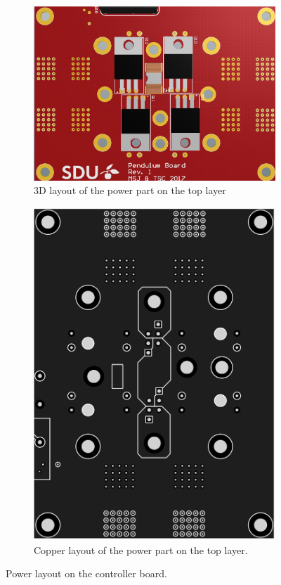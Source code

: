 \begin{figure}
	\centering
	\begin{subfigure}[b]{0.49\textwidth}
		\centering
		\includegraphics[angle=90,width=\linewidth]{graphics/power_layout_3}
		\caption{3D layout of the power part on the top layer}
		\label{sfig:power_layout_3}
	\end{subfigure}
	\begin{subfigure}[b]{0.49\textwidth} 
		\centering
		\includegraphics[width=\linewidth]{graphics/power_layout}
		\caption{Copper layout of the power part on the top layer.}
		\label{sfig:power_layout_2}
	\end{subfigure}
	\caption{Power layout on the controller board.}
	\label{fig:power_layout}
\end{figure}

